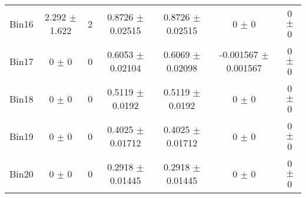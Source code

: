 \begin{tabular}{@{\extracolsep{4pt}}lcccccc@{}}
     Bin16 & 2.292 $\pm$ 1.622 & 2 & 0.8726 $\pm$ 0.02515 & 0.8726 $\pm$ 0.02515 & 0 $\pm$ 0 & 0 $\pm$ 0 \\ 
     Bin17 & 0 $\pm$ 0 & 0 & 0.6053 $\pm$ 0.02104 & 0.6069 $\pm$ 0.02098 & -0.001567 $\pm$ 0.001567 & 0 $\pm$ 0 \\ 
     Bin18 & 0 $\pm$ 0 & 0 & 0.5119 $\pm$ 0.0192 & 0.5119 $\pm$ 0.0192 & 0 $\pm$ 0 & 0 $\pm$ 0 \\ 
     Bin19 & 0 $\pm$ 0 & 0 & 0.4025 $\pm$ 0.01712 & 0.4025 $\pm$ 0.01712 & 0 $\pm$ 0 & 0 $\pm$ 0 \\ 
     Bin20 & 0 $\pm$ 0 & 0 & 0.2918 $\pm$ 0.01445 & 0.2918 $\pm$ 0.01445 & 0 $\pm$ 0 & 0 $\pm$ 0 \\ 
\hline\hline
  \end{tabular}
